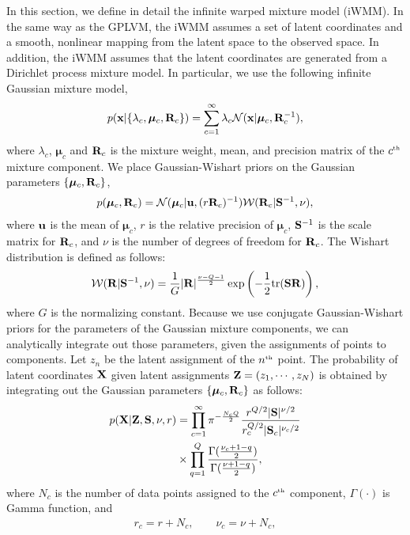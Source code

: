 In this section, we define in detail the infinite warped mixture model (iWMM).
In the same way as the GPLVM, the iWMM assumes a set of latent coordinates and a smooth, nonlinear mapping from the latent space to the observed space.
In addition, the iWMM assumes that the latent coordinates
are generated from a Dirichlet process mixture model.
In particular, we use the following infinite Gaussian mixture model,
\begin{align}
p({\bf{x}}|\{\lambda_{c},\bm{\mu}_{c},\mathbf{R}_{c}\}) = \sum_{c=1}^{\infty} \lambda_{c} {\cal N}({\bf{x}}|\bm{\mu}_{c},\mathbf{R}_{c}^{-1}),
\end{align}
where $\lambda_{c}$, $\bm{\mu}_{c}$ and $\mathbf{R}_{c}$ is the mixture weight, 
mean, and precision matrix of the $c^{\text{\tiny th}}$ mixture component.
We place Gaussian-Wishart priors on the Gaussian parameters
$\{\bm{\mu}_{c},\mathbf{R}_{c}\}$,
\begin{align}
p(\bm{\mu}_{c},\mathbf{R}_{c})
= {\cal N}(\bm{\mu}_{c}|{\bf{u}},(r\mathbf{R}_{c})^{-1})
{\cal W}(\mathbf{R}_{c}|\mathbf{S}^{-1},\nu),
\end{align}
where ${\bf{u}}$ is the mean of $\bm{\mu}_{c}$, 
$r$ is the relative precision of $\bm{\mu}_{c}$, 
$\mathbf{S}^{-1}$ is the scale matrix for $\mathbf{R}_{c}$, 
and $\nu$ is the number of degrees of freedom for $\mathbf{R}_{c}$.
The Wishart distribution is defined as follows:
\begin{align}
{\cal W}(\mathbf{R}|\mathbf{S}^{-1},\nu)
=\frac{1}{G}|\mathbf{R}|^{\frac{\nu-Q-1}{2}}\exp\left(-\frac{1}{2}{\rm tr}(\mathbf{S}\mathbf{R})\right),
\end{align}
where $G$ is the normalizing constant.
Because we use conjugate Gaussian-Wishart priors 
for the parameters of the Gaussian mixture components, we can analytically integrate out those parameters, given the assignments of points to components.
Let $z_{n}$ be the latent assignment of the $n^{\text{\tiny th}}$ point.
The probability of latent coordinates $\mathbf{X}$
given latent assignments $\mathbf{Z}=(z_{1},\cdots,z_{N})$ is obtained 
by integrating out the Gaussian parameters $\{\bm{\mu}_{c},\mathbf{R}_{c}\}$
as follows:
\begin{align}
p(\mathbf{X}|\mathbf{Z},\mathbf{S},\nu,r) &= \prod_{c=1}^{\infty}
\pi^{-\frac{N_{c}Q}{2}}\frac{r^{Q/2}|\mathbf{S}|^{\nu/2}}{r_{c}^{Q/2}|\mathbf{S}_{c}|^{\nu_{c}/2}}
\nonumber\\
&\times \prod_{q=1}^{Q}\frac{\Gamma(\frac{\nu_{c}+1-q}{2})}{\Gamma(\frac{\nu+1-q}{2})},
\label{eq:px_z}
\end{align}
where
$N_{c}$ is the number of data points assigned to the $c^{\text{\tiny th}}$ component,
$\Gamma(\cdot)$ is Gamma function,
and
\begin{align}
r_{c}=r+N_{c}, \hspace{2em}
\nu_{c}=\nu+N_{c}, 
\nonumber
\end{align}
